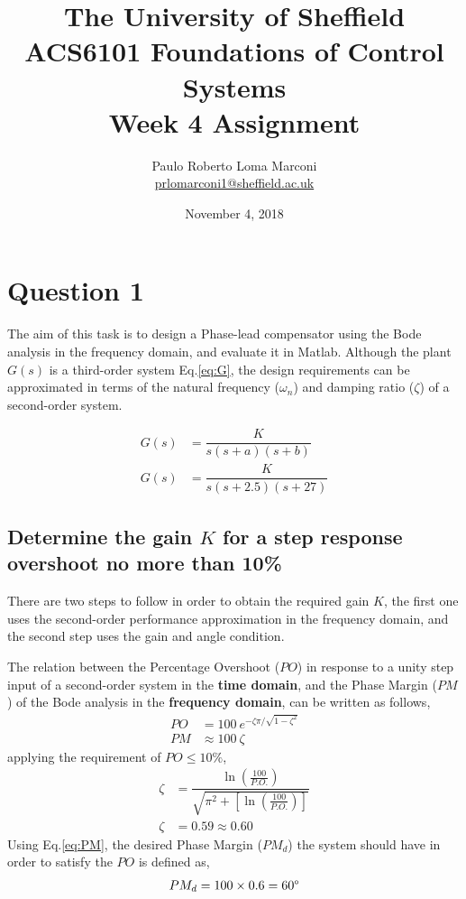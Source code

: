 \documentclass[11pt, a4paper]{article}
\title{The University of Sheffield\\
	ACS6101 Foundations of Control Systems\\ 
	Week 4 Assignment}
\author{Paulo Roberto Loma Marconi\\ \url{prlomarconi1@sheffield.ac.uk}}
\date{November 4, 2018}
\begin{document}
\maketitle

\section{Question 1}
The aim of this task is to design a Phase-lead compensator using the Bode analysis in the frequency domain, and evaluate it in Matlab. Although the plant $G(s)$ is a third-order system Eq.\eqref{eq:G}, the design requirements can be approximated in terms of the natural frequency ($\omega_n$) and damping ratio ($\zeta$) of a second-order system.

\begin{align}
G(s) &= \dfrac{K}{s(s+a)(s+b)} \label{eq:G}\\
G(s) &= \dfrac{K}{s(s+2.5)(s+27)} \nonumber
\end{align} 

\subsection{Determine the gain $K$ for a step response overshoot no more than 10\%}
There are two steps to follow in order to obtain the required gain $K$, the first one uses the second-order performance approximation in the frequency domain, and the second step uses the gain and angle condition.

The relation between the Percentage Overshoot ($PO$) in response to a unity step input of a second-order system in the \textbf{time domain}, and the Phase Margin ($PM$) of the Bode analysis in the \textbf{frequency domain}, can be written as follows,
\begin{align}
PO &= 100~e^{-\zeta\pi/\sqrt{1-\zeta^2}} \label{PO} \\
PM &\approx 100 ~\zeta \label{eq:PM}
\end{align}
applying the requirement of $PO\leq10\%$,
\begin{align}
\zeta &= \dfrac{ \ln\left(\frac{100}{P.O.}\right) }{\sqrt{\pi^2+\left[ \ln \left(  \frac{100}{P.O.}\right)\right]}}	\label{eq:zeta} \\
\zeta &= 0.59 \approx 0.60 \nonumber
\end{align}
Using Eq.\eqref{eq:PM}, the desired Phase Margin ($PM_d$) the system should have in order to satisfy the $PO$ is defined as,
\begin{align*}
PM_d = 100\times 0.6 = 60\degree
\end{align*}
\end{document}
